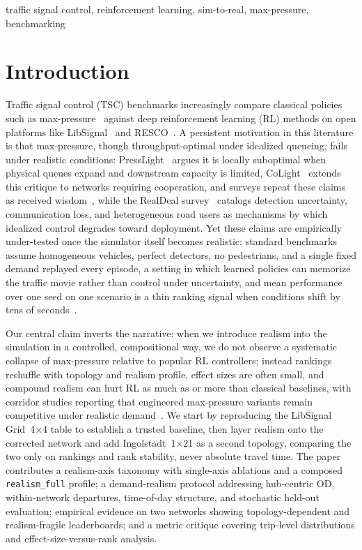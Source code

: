 \documentclass[conference]{IEEEtran}
\newcommand{\realismfull}{\texttt{realism\_full}}
\begin{document}
\begin{IEEEkeywords}
traffic signal control, reinforcement learning, sim-to-real, max-pressure, benchmarking
\end{IEEEkeywords}

\section{Introduction}

Traffic signal control (TSC) benchmarks increasingly compare classical policies such as max-pressure~\cite{varaiya2013maxpressure} against deep reinforcement learning (RL) methods on open platforms like LibSignal~\cite{mei2023libsignal} and RESCO~\cite{ault2021resco}. A persistent motivation in this literature is that max-pressure, though throughput-optimal under idealized queueing, fails under realistic conditions: PressLight~\cite{wei2019presslight} argues it is locally suboptimal when physical queues expand and downstream capacity is limited, CoLight~\cite{wei2019colight} extends this critique to networks requiring cooperation, and surveys repeat these claims as received wisdom~\cite{wei2019survey, noaeen2021recent}, while the RealDeal survey~\cite{chen2022realdeal} catalogs detection uncertainty, communication loss, and heterogeneous road users as mechanisms by which idealized control degrades toward deployment. Yet these claims are empirically under-tested once the simulator itself becomes realistic: standard benchmarks assume homogeneous vehicles, perfect detectors, no pedestrians, and a single fixed demand replayed every episode, a setting in which learned policies can memorize the traffic movie rather than control under uncertainty, and mean performance over one seed on one scenario is a thin ranking signal when conditions shift by tens of seconds~\cite{agarwal2021rliable}.

Our central claim inverts the narrative: when we introduce realism into the simulation in a controlled, compositional way, we do not observe a systematic collapse of max-pressure relative to popular RL controllers; instead rankings reshuffle with topology and realism profile, effect sizes are often small, and compound realism can hurt RL as much as or more than classical baselines, with corridor studies reporting that engineered max-pressure variants remain competitive under realistic demand~\cite{islam2022mprealistic}. We start by reproducing the LibSignal Grid~4$\times$4 table to establish a trusted baseline, then layer realism onto the corrected network and add Ingolstadt~1$\times$21 as a second topology, comparing the two only on rankings and rank stability, never absolute travel time. The paper contributes a realism-axis taxonomy with single-axis ablations and a composed \realismfull{} profile; a demand-realism protocol addressing hub-centric OD, within-network departures, time-of-day structure, and stochastic held-out evaluation; empirical evidence on two networks showing topology-dependent and realism-fragile leaderboards; and a metric critique covering trip-level distributions and effect-size-versus-rank analysis.
\end{document}
